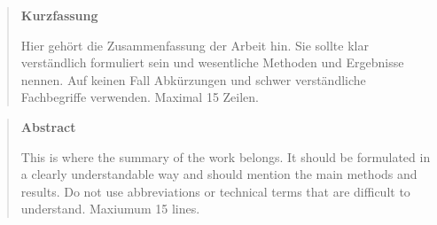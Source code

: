 \vspace*{2cm}

\begin{abstract}
\begin{center}
\normalsize \textbf{Kurzfassung}\\
\end{center}

\noindent
Hier gehört die Zusammenfassung der Arbeit hin. Sie sollte klar verständlich formuliert sein und wesentliche Methoden und Ergebnisse nennen. Auf keinen Fall Abkürzungen und schwer verständliche Fachbegriffe verwenden. Maximal 15 Zeilen. 
\end{abstract}

\vspace{2cm}
\begin{abstract}
\begin{center}
\normalsize \textbf{Abstract}\\
\end{center}

\noindent
This is where the summary of the work belongs. It should be formulated in a clearly understandable way and should mention the main methods and results. Do not use abbreviations or technical terms that are difficult to understand. Maxiumum 15 lines.
\end{abstract}


